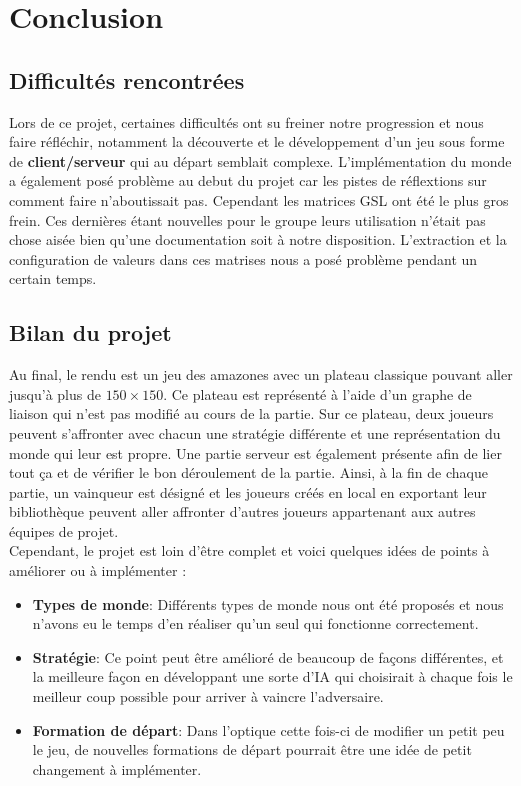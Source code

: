 \chapter{Conclusion}

\section{Difficultés rencontrées}

Lors de ce projet, certaines difficultés ont su freiner notre progression et nous faire réfléchir, notamment la découverte et le développement d'un jeu sous forme de \textbf{client/serveur} qui au départ semblait complexe. L'implémentation du monde a également posé problème au debut du projet car les pistes de réflextions sur comment faire n'aboutissait pas. Cependant les matrices GSL ont été le plus gros frein. Ces dernières étant nouvelles pour le groupe leurs utilisation n'était pas chose aisée bien qu'une documentation soit à notre disposition. L'extraction et la configuration de valeurs dans ces matrises nous a posé problème pendant un certain temps.    

\section{Bilan du projet}
Au final, le rendu est un jeu  des amazones avec un plateau classique pouvant aller jusqu'à plus de $150 \times 150$. Ce plateau est représenté à l'aide d'un graphe de liaison qui n'est pas modifié au cours de la partie. Sur ce plateau, deux joueurs peuvent s'affronter avec chacun une stratégie différente et une représentation du monde qui leur est propre. Une partie serveur est également présente afin de lier tout ça et de vérifier le bon déroulement de la partie. Ainsi, à la fin de chaque partie, un vainqueur est désigné et les joueurs créés en local en exportant leur bibliothèque peuvent aller affronter d'autres joueurs appartenant aux autres équipes de projet. 
\\
Cependant, le projet est loin d'être complet et voici quelques idées de points à améliorer ou à implémenter :
\medbreak
\begin{itemize}
    \item \textbf{Types de monde}: Différents types de monde nous ont été proposés et nous n'avons eu le temps d'en réaliser qu'un seul qui fonctionne correctement.
    \item \textbf{Stratégie}: Ce point peut être amélioré de beaucoup de façons différentes, et la meilleure façon en développant une sorte d'IA qui choisirait à chaque fois le meilleur coup possible pour arriver à vaincre l'adversaire.
    \item \textbf{Formation de départ}: Dans l'optique cette fois-ci de modifier un petit peu le jeu, de nouvelles formations de départ pourrait être une idée de petit changement à implémenter.
\end{itemize}

